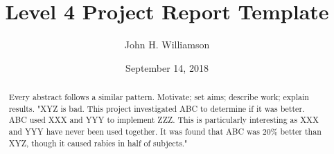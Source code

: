 \documentclass{l4proj}
\begin{document}
\title{Level 4 Project Report Template}
\author{John H. Williamson}
\date{September 14, 2018}

\maketitle

\begin{abstract}
    Every abstract follows a similar pattern. Motivate; set aims; describe work; explain results.
    "XYZ is bad. This project investigated ABC to determine if it was better. 
    ABC used XXX and YYY to implement ZZZ. This is particularly interesting as XXX and YYY have
    never been used together. It was found that  
    ABC was 20\% better than XYZ, though it caused rabies in half of subjects."


\end{abstract}


%
%
%
\educationalconsent


\tableofcontents





\end{document}
